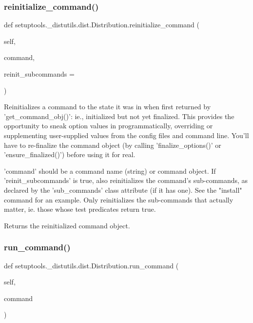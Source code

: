 \subsubsection{\texorpdfstring{reinitialize\+\_\+command()}{reinitialize\_command()}}
{\footnotesize\ttfamily def setuptools.\+\_\+distutils.\+dist.\+Distribution.\+reinitialize\+\_\+command (\begin{DoxyParamCaption}\item[{}]{self,  }\item[{}]{command,  }\item[{}]{reinit\+\_\+subcommands = {} }\end{DoxyParamCaption})}

\begin{DoxyVerb}Reinitializes a command to the state it was in when first
returned by 'get_command_obj()': ie., initialized but not yet
finalized.  This provides the opportunity to sneak option
values in programmatically, overriding or supplementing
user-supplied values from the config files and command line.
You'll have to re-finalize the command object (by calling
'finalize_options()' or 'ensure_finalized()') before using it for
real.

'command' should be a command name (string) or command object.  If
'reinit_subcommands' is true, also reinitializes the command's
sub-commands, as declared by the 'sub_commands' class attribute (if
it has one).  See the "install" command for an example.  Only
reinitializes the sub-commands that actually matter, ie. those
whose test predicates return true.

Returns the reinitialized command object.
\end{DoxyVerb}
 \mbox{\label{classsetuptools_1_1__distutils_1_1dist_1_1Distribution_a69968cc68f4d05e9f6514dac1d9c013c}} 
\subsubsection{\texorpdfstring{run\+\_\+command()}{run\_command()}}
{\footnotesize\ttfamily def setuptools.\+\_\+distutils.\+dist.\+Distribution.\+run\+\_\+command (\begin{DoxyParamCaption}\item[{}]{self,  }\item[{}]{command }\end{DoxyParamCaption})}

